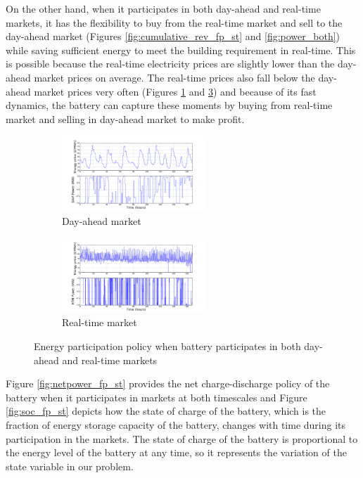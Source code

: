 \documentclass[11pt,twoside]{article}
\begin{document}
\FloatBarrier
On the other hand, when it participates in both day-ahead and real-time markets, it has the flexibility to buy from the real-time market and sell to the day-ahead market  (Figures \ref{fig:cumulative_rev_fp_st} and \ref{fig:power_both}) while saving sufficient energy to meet the building requirement in real-time. This is possible because the real-time electricity prices are slightly lower than the day-ahead market prices on average. The real-time prices also fall below the day-ahead market prices very often (Figures \ref{fig:Pdam_fp_st} and \ref{fig:Prtm_fp_st}) and because of its fast dynamics, the battery can capture these moments by buying from real-time market and selling in day-ahead market to make profit. 
\begin{figure}[h!]\label{fig:power_both}
\begin{subfigure}{\textwidth}
\centering
\includegraphics[width=0.6\textwidth]{Figures/Plots/fullproblem_stoch/Pdam_fp_st.pdf} \caption{Day-ahead market}\label{fig:Pdam_fp_st}
\end{subfigure}
\begin{subfigure}{\textwidth}
\centering
\includegraphics[width=0.6\textwidth]{Figures/Plots/fullproblem_stoch/Prtm_fp_st.pdf} \caption{Real-time market}\label{fig:Prtm_fp_st}
\end{subfigure}
\caption{Energy participation policy when battery participates in both day-ahead and real-time markets}
\end{figure}
\FloatBarrier
Figure \ref{fig:netpower_fp_st} provides the net charge-discharge policy of the battery when it participates in markets at both timescales and Figure \ref{fig:soc_fp_st} depicts how the state of charge of the battery, which is the fraction of energy storage capacity of the battery, changes with time during its participation in the markets. The state of charge of the battery is proportional to the energy level of the battery at any time, so it represents the variation of the state variable in our problem.
\end{document}
